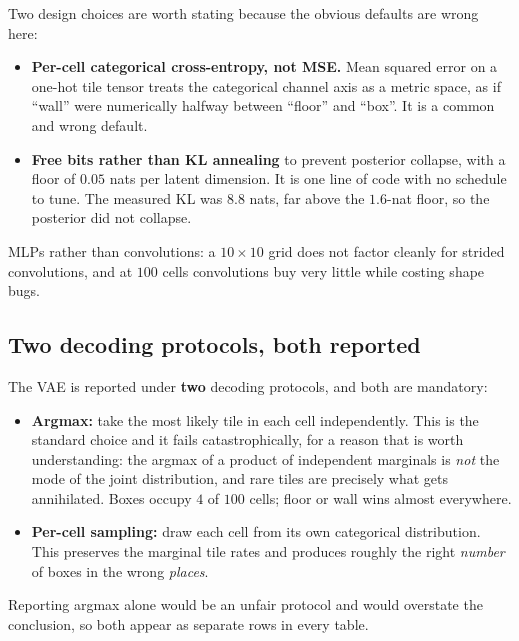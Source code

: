 \documentclass[11pt,a4paper]{report}
\begin{document}
Two design choices are worth stating because the obvious defaults are wrong here:

\begin{itemize}[leftmargin=1.5em,itemsep=2pt]
\item \textbf{Per-cell categorical cross-entropy, not MSE.} Mean squared error
      on a one-hot tile tensor treats the categorical channel axis as a metric
      space, as if ``wall'' were numerically halfway between ``floor'' and
      ``box''. It is a common and wrong default.
\item \textbf{Free bits rather than KL annealing} to prevent posterior collapse,
      with a floor of $0.05$ nats per latent dimension. It is one line of code
      with no schedule to tune. The measured KL was $8.8$ nats, far above the
      $1.6$-nat floor, so the posterior did not collapse.
\end{itemize}

MLPs rather than convolutions: a $10\times10$ grid does not factor cleanly for
strided convolutions, and at $100$ cells convolutions buy very little while
costing shape bugs.

\subsection{Two decoding protocols, both reported}

The VAE is reported under \textbf{two} decoding protocols, and both are
mandatory:

\begin{itemize}[leftmargin=1.5em,itemsep=2pt]
\item \textbf{Argmax:} take the most likely tile in each cell independently.
      This is the standard choice and it fails catastrophically, for a reason
      that is worth understanding: the argmax of a product of independent
      marginals is \emph{not} the mode of the joint distribution, and rare tiles
      are precisely what gets annihilated. Boxes occupy $4$ of $100$ cells;
      floor or wall wins almost everywhere.
\item \textbf{Per-cell sampling:} draw each cell from its own categorical
      distribution. This preserves the marginal tile rates and produces roughly
      the right \emph{number} of boxes in the wrong \emph{places}.
\end{itemize}

Reporting argmax alone would be an unfair protocol and would overstate the
conclusion, so both appear as separate rows in every table.
\end{document}
